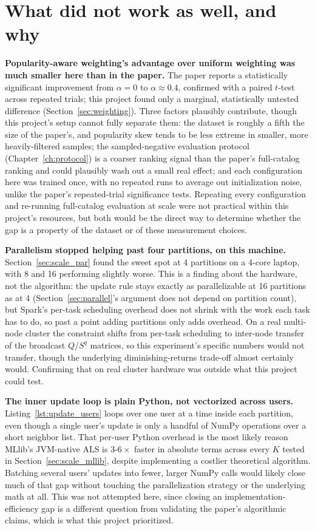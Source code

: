 \section{What did not work as well, and why}
\label{sec:weaknesses}

\textbf{Popularity-aware weighting's advantage over uniform weighting was
much smaller here than in the paper.} The paper reports a statistically
significant improvement from $\alpha=0$ to $\alpha\approx0.4$, confirmed
with a paired $t$-test across repeated trials; this project found only a
marginal, statistically untested difference (Section~\ref{sec:weighting}).
Three factors plausibly contribute, though this project's setup cannot
fully separate them: the dataset is roughly a fifth the size of the
paper's, and popularity skew tends to be less extreme in smaller,
more heavily-filtered samples; the sampled-negative evaluation protocol
(Chapter~\ref{ch:protocol}) is a coarser ranking signal than the paper's
full-catalog ranking and could plausibly wash out a small real effect; and
each configuration here was trained once, with no repeated runs to average
out initialization noise, unlike the paper's repeated-trial significance
tests. Repeating every configuration and re-running full-catalog evaluation
at scale were not practical within this project's resources, but both
would be the direct way to determine whether the gap is a property of the
dataset or of these measurement choices.

\medskip
\textbf{Parallelism stopped helping past four partitions, on this
machine.} Section~\ref{sec:scale_par} found the sweet spot at 4 partitions
on a 4-core laptop, with 8 and 16 performing slightly worse. This is a
finding about the hardware, not the algorithm: the update rule stays
exactly as parallelizable at 16 partitions as at 4
(Section~\ref{sec:parallel}'s argument does not depend on partition
count), but Spark's per-task scheduling overhead does not shrink with the
work each task has to do, so past a point adding partitions only adds
overhead. On a real multi-node cluster the constraint shifts from
per-task scheduling to inter-node transfer of the broadcast $Q$/$S^q$
matrices, so this experiment's specific numbers would not transfer, though
the underlying diminishing-returns trade-off almost certainly would.
Confirming that on real cluster hardware was outside what this project
could test.

\medskip
\textbf{The inner update loop is plain Python, not vectorized across
users.} Listing~\ref{lst:update_users} loops over one user at a time
inside each partition, even though a single user's update is only a
handful of NumPy operations over a short neighbor list. That per-user
Python overhead is the most likely reason MLlib's JVM-native ALS is
$3$-$6\times$ faster in absolute terms across every $K$ tested in
Section~\ref{sec:scale_mllib}, despite implementing a costlier theoretical
algorithm. Batching several users' updates into fewer, larger NumPy calls
would likely close much of that gap without touching the parallelization
strategy or the underlying math at all. This was not attempted here, since
closing an implementation-efficiency gap is a different question from
validating the paper's algorithmic claims, which is what this project
prioritized.

